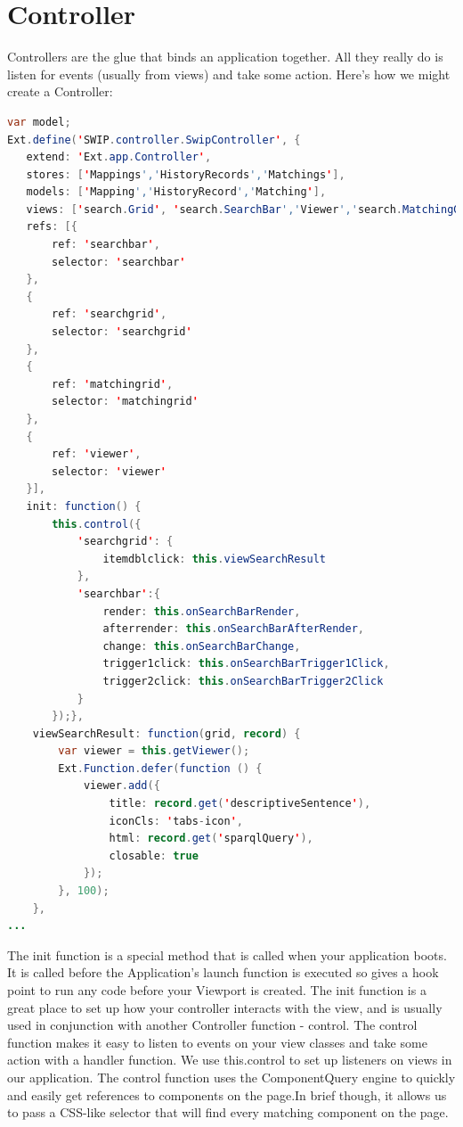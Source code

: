 \section{Controller} 
Controllers are the glue that binds an application together. All they really do is listen for events (usually from views) and take some action. Here's how we might create a Controller:
\begin{lstlisting}[language=Java]
var model;
Ext.define('SWIP.controller.SwipController', {
   extend: 'Ext.app.Controller',
   stores: ['Mappings','HistoryRecords','Matchings'],
   models: ['Mapping','HistoryRecord','Matching'],
   views: ['search.Grid', 'search.SearchBar','Viewer','search.MatchingGrid'],
   refs: [{
       ref: 'searchbar',
       selector: 'searchbar'
   },
   {
       ref: 'searchgrid',
       selector: 'searchgrid'
   },
   {
       ref: 'matchingrid',
       selector: 'matchingrid'
   },        
   {
       ref: 'viewer',
       selector: 'viewer'
   }],
   init: function() {
       this.control({
           'searchgrid': {
               itemdblclick: this.viewSearchResult
           },
           'searchbar':{
               render: this.onSearchBarRender,
               afterrender: this.onSearchBarAfterRender,
               change: this.onSearchBarChange,
               trigger1click: this.onSearchBarTrigger1Click, 
               trigger2click: this.onSearchBarTrigger2Click   
           }
       });},
	viewSearchResult: function(grid, record) {
    	var viewer = this.getViewer();
       	Ext.Function.defer(function () {
        	viewer.add({
            	title: record.get('descriptiveSentence'),
               	iconCls: 'tabs-icon',
               	html: record.get('sparqlQuery'),
               	closable: true
           	});
       	}, 100);
   	},
...	
\end{lstlisting}
\par The init function is a special method that is called when your application boots. It is called before the Application's launch function is executed so gives a hook point to run any code before your Viewport is created. The init function is a great place to set up how your controller interacts with the view, and is usually used in conjunction with another Controller function - control. The control function makes it easy to listen to events on your view classes and take some action with a handler function. We use this.control to set up listeners on views in our application. The control function uses the ComponentQuery engine to quickly and easily get references to components on the page.In brief though, it allows us to pass a CSS-like selector that will find every matching component on the page. \\

